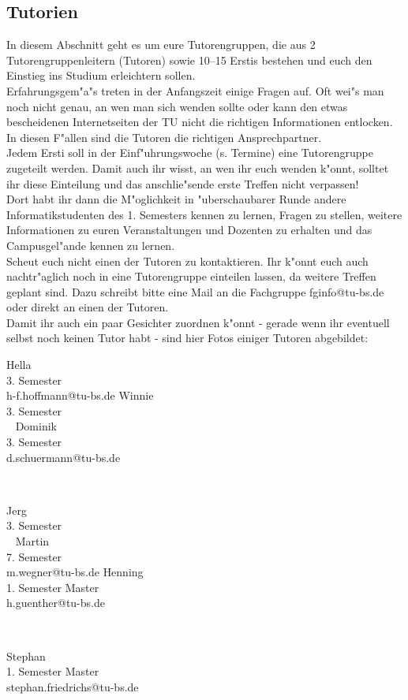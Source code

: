\subsection{Tutorien}

In diesem Abschnitt geht es um eure Tutorengruppen, die aus 2 Tutorengruppenleitern (Tutoren) sowie 10--15 Erstis bestehen und euch den Einstieg ins Studium erleichtern sollen.\\
Erfahrungsgem"a"s treten in der Anfangszeit einige Fragen auf. Oft wei"s man noch nicht genau, an wen man sich wenden sollte oder kann den etwas bescheidenen Internetseiten der TU nicht die richtigen Informationen entlocken. In diesen F"allen sind die Tutoren die richtigen Ansprechpartner.\\
Jedem Ersti soll in der Einf"uhrungswoche (s. Termine) eine Tutorengruppe zugeteilt werden. Damit auch ihr wisst, an wen ihr euch wenden k"onnt, solltet ihr diese Einteilung und das anschlie"sende erste Treffen nicht verpassen!\\
Dort habt ihr dann die M"oglichkeit in "uberschaubarer Runde andere Informatikstudenten des 1. Semesters kennen zu lernen, Fragen zu stellen, weitere Informationen zu euren Veranstaltungen und Dozenten zu erhalten und das Campusgel"ande kennen zu lernen.\\
Scheut euch nicht einen der Tutoren zu kontaktieren. Ihr k"onnt euch auch nachtr"aglich noch in eine Tutorengruppe einteilen lassen, da weitere Treffen geplant sind. Dazu schreibt bitte eine Mail an die Fachgruppe fginfo@tu-bs.de oder direkt an einen der Tutoren.\\
Damit ihr auch ein paar Gesichter zuordnen k"onnt - gerade wenn ihr eventuell selbst noch keinen Tutor habt - sind hier Fotos einiger Tutoren abgebildet:

\onecolumn

{Hella\\3. Semester\\h-f.hoffmann@tu-bs.de}
\hfill
{}
{Winnie\\3. Semester\\ ~}
\hfill
{}
{Dominik\\3. Semester\\d.schuermann@tu-bs.de}
\par \ \par
{}
{Jerg\\3. Semester\\ ~}
\hfill
{}
{Martin\\7. Semester\\ m.wegner@tu-bs.de}
\hfill
{}
{Henning\\1. Semester Master\\h.guenther@tu-bs.de}
\par \ \par
{}
{Stephan\\1. Semester Master\\ stephan.friedrichs@tu-bs.de}

\twocolumn